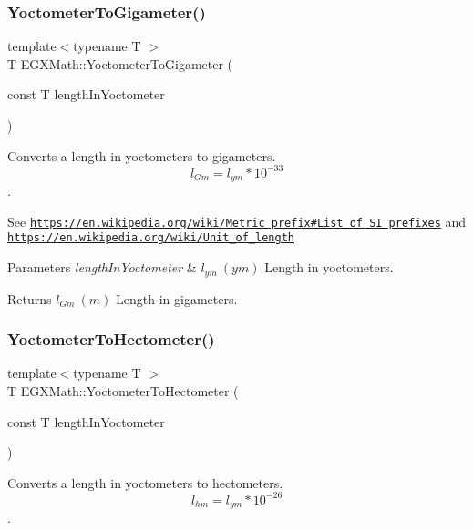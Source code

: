 \subsubsection{\texorpdfstring{Yoctometer\+To\+Gigameter()}{YoctometerToGigameter()}}
{\footnotesize\ttfamily template$<$typename T $>$ \\
T E\+G\+X\+Math\+::\+Yoctometer\+To\+Gigameter (\begin{DoxyParamCaption}\item[{const T}]{length\+In\+Yoctometer }\end{DoxyParamCaption})}



Converts a length in yoctometers to gigameters. \[ l_{Gm}=l_{ym} * 10^{-33} \]. 

See \href{https://en.wikipedia.org/wiki/Metric_prefix#List_of_SI_prefixes}{\tt https\+://en.\+wikipedia.\+org/wiki/\+Metric\+\_\+prefix\#\+List\+\_\+of\+\_\+\+S\+I\+\_\+prefixes} and \href{https://en.wikipedia.org/wiki/Unit_of_length}{\tt https\+://en.\+wikipedia.\+org/wiki/\+Unit\+\_\+of\+\_\+length} 
\begin{DoxyParams}{Parameters}
{\em length\+In\+Yoctometer} & $ l_{ym}\ (ym)$ Length in yoctometers. \\
\hline
\end{DoxyParams}
\begin{DoxyReturn}{Returns}
$ l_{Gm}\ (m)$ Length in gigameters. 
\end{DoxyReturn}
\mbox{\label{group___e_g_x_math-_conversions-_length_conversions-_yoctometer-_s_i_ga3f2a47723b097c9c2b38edf4ca14ff03}} 
\subsubsection{\texorpdfstring{Yoctometer\+To\+Hectometer()}{YoctometerToHectometer()}}
{\footnotesize\ttfamily template$<$typename T $>$ \\
T E\+G\+X\+Math\+::\+Yoctometer\+To\+Hectometer (\begin{DoxyParamCaption}\item[{const T}]{length\+In\+Yoctometer }\end{DoxyParamCaption})}



Converts a length in yoctometers to hectometers. \[ l_{hm}=l_{ym} * 10^{-26} \]. 


